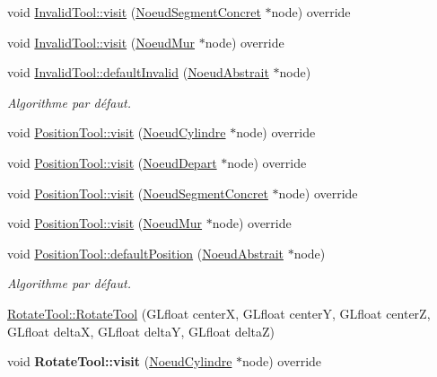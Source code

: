 \begin{DoxyCompactItemize}
\item 
void \hyperlink{group__inf2990_ga2f8397c63d7f895906f49ab95de03f13}{Invalid\-Tool\-::visit} (\hyperlink{class_noeud_segment_concret}{Noeud\-Segment\-Concret} $\ast$node) override
\item 
void \hyperlink{group__inf2990_gab69a438cb8d2abff211cd450c9f946f5}{Invalid\-Tool\-::visit} (\hyperlink{class_noeud_mur}{Noeud\-Mur} $\ast$node) override
\item 
void \hyperlink{group__inf2990_gafb96baa12cb0df8c48c84dd12badd757}{Invalid\-Tool\-::default\-Invalid} (\hyperlink{class_noeud_abstrait}{Noeud\-Abstrait} $\ast$node)
\begin{DoxyCompactList}\small\item\em Algorithme par défaut. \end{DoxyCompactList}\item 
void \hyperlink{group__inf2990_gac1643483872455c76ef059ac67ae6d04}{Position\-Tool\-::visit} (\hyperlink{class_noeud_cylindre}{Noeud\-Cylindre} $\ast$node) override
\item 
void \hyperlink{group__inf2990_ga25f3c9e1decf3bf95d1e7491a2668565}{Position\-Tool\-::visit} (\hyperlink{class_noeud_depart}{Noeud\-Depart} $\ast$node) override
\item 
void \hyperlink{group__inf2990_ga48b51161058393ca12df07c9d28197a7}{Position\-Tool\-::visit} (\hyperlink{class_noeud_segment_concret}{Noeud\-Segment\-Concret} $\ast$node) override
\item 
void \hyperlink{group__inf2990_gaf80e360d0e162b7075f5272e5860f60f}{Position\-Tool\-::visit} (\hyperlink{class_noeud_mur}{Noeud\-Mur} $\ast$node) override
\item 
void \hyperlink{group__inf2990_ga805981677e352dd98b018d04376bb6eb}{Position\-Tool\-::default\-Position} (\hyperlink{class_noeud_abstrait}{Noeud\-Abstrait} $\ast$node)
\begin{DoxyCompactList}\small\item\em Algorithme par défaut. \end{DoxyCompactList}\item 
\hyperlink{group__inf2990_ga53087375f63f0e400fdd0bf569e90ad0}{Rotate\-Tool\-::\-Rotate\-Tool} (G\-Lfloat center\-X, G\-Lfloat center\-Y, G\-Lfloat center\-Z, G\-Lfloat delta\-X, G\-Lfloat delta\-Y, G\-Lfloat delta\-Z)
\item 
\hypertarget{group__inf2990_ga4142a7bdd90761c6dbda240a3fe62b5d}{void {\bfseries Rotate\-Tool\-::visit} (\hyperlink{class_noeud_cylindre}{Noeud\-Cylindre} $\ast$node) override}\label{group__inf2990_ga4142a7bdd90761c6dbda240a3fe62b5d}


\end{DoxyCompactItemize}
